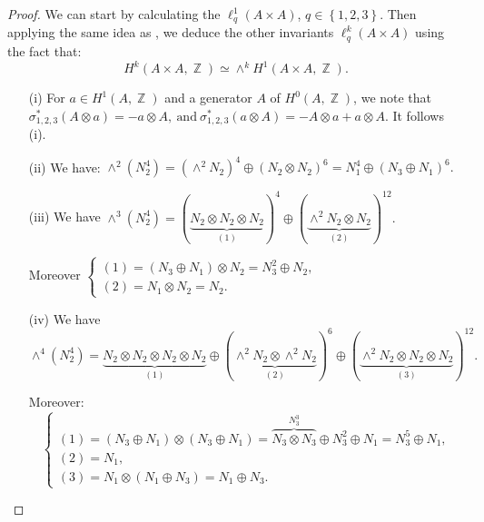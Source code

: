 \documentclass[a4paper]{article}
\theoremstyle{remark}
\DeclareMathOperator{\Z}{\mathbb{Z}}
\begin{document}
\begin{proof}
We can start by calculating the $\ell_q^1(A\times A)$, $q\in \left\{1,2,3\right\}$. Then applying the same idea as \cite[Lemma 6.14]{SmithTh}, we deduce the other invariants $\ell_q^k(A\times A)$ using the fact that: 
$$H^k(A\times A,\Z)\simeq\wedge^k H^1(A\times A,\Z).$$
\begin{itemize}
\item[(i)]
For $a\in H^1(A,\Z)$ and a generator $A$ of $H^0(A,\Z)$, we note that
$\sigma_{1,2,3}^*(A\otimes a)=-a\otimes A,\ \text{and}\ \sigma_{1,2,3}^*(a\otimes A)=-A\otimes a+a\otimes A.$
It follows (i).
\item[(ii)]
We have:
$\wedge^2 (N_2^4)=(\wedge^2 N_2)^4\oplus(N_2\otimes N_2)^6=N_1^4\oplus(N_3\oplus N_1)^6.$
\item[(iii)]
We have
$\wedge^3 (N_2^4)=(\underbrace{N_2\otimes N_2\otimes N_2}_{(1)})^4\oplus (\underbrace{\wedge^2 N_2\otimes N_2 }_{(2)})^{12}.$

Moreover
$\begin{cases}
(1)=(N_3\oplus N_1)\otimes N_2=N_3^2\oplus N_2,\\
(2)=N_1\otimes N_2=N_2.
\end{cases}$
\item[(iv)]
We have
$\wedge^4 (N_2^4)=\underbrace{N_2\otimes N_2\otimes N_2\otimes N_2}_{(1)}\oplus(\underbrace{\wedge^2 N_2 \otimes \wedge^2 N_2}_{(2)})^6\oplus (\underbrace{\wedge^2 N_2\otimes N_2 \otimes N_2}_{(3)})^{12}.$

Moreover:
\begin{equation}
\begin{cases}
(1)=(N_3\oplus N_1)\otimes (N_3\oplus N_1)=\overbrace{N_3\otimes N_3}^{N_3^3} \oplus N_3^2\oplus N_1=N_3^5\oplus N_1,\\
(2)=N_1,\\
(3)=N_1\otimes (N_1\oplus N_3)=N_1\oplus N_3.
\end{cases}
\end{equation}
\end{itemize}
\end{proof}
\end{document}
